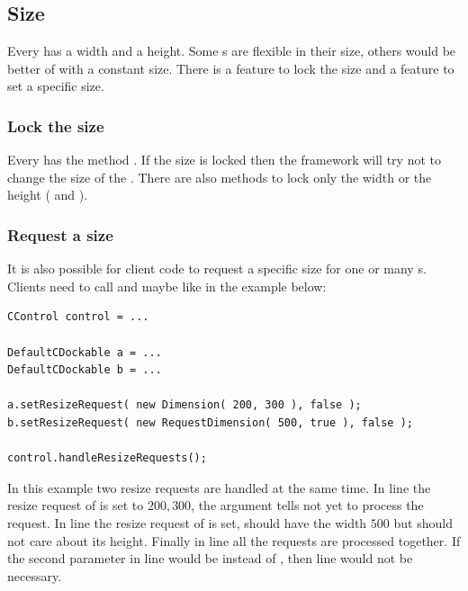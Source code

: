 
\subsection{Size} \label{sec:size}
Every  has a width and a height. Some s are flexible in their size, others would be better of with a constant size. There is a feature to lock the size and a feature to set a specific size.

\subsubsection{Lock the size}
Every  has the method . If the size is locked then the framework will try not to change the size of the . There are also methods to lock only the width or the height \linebreak ( and ).


\subsubsection{Request a size}
It is also possible for client code to request a specific size for one or many s. Clients need to call  and maybe \linebreak {} like in the example below:

\begin{lstlisting}
CControl control = ...

DefaultCDockable a = ...
DefaultCDockable b = ...

a.setResizeRequest( new Dimension( 200, 300 ), false );
b.setResizeRequest( new RequestDimension( 500, true ), false );

control.handleResizeRequests();
\end{lstlisting}
In this example two resize requests are handled at the same time. In line  the resize request of  is set to $200, 300$, the argument  tells  not yet to process the request. In line  the resize request of  is set,  should have the width $500$ but should not care about its height. Finally in line  all the requests are processed together. If the second parameter in line  would be  instead of , then line  would not be necessary.

